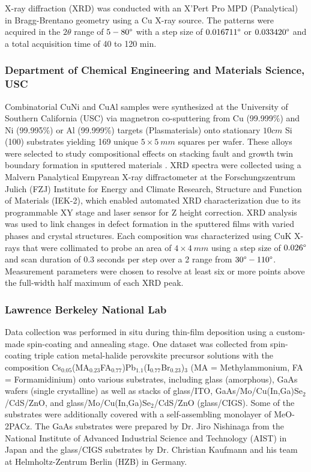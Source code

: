 X-ray diffraction (XRD) was conducted with an X’Pert Pro MPD (Panalytical) in Bragg-Brentano geometry using a Cu X-ray source. The patterns were acquired in the $2\theta$ range of $5-80\degree$ with a step size of $0.016711\degree$ or $0.033420\degree$ and a total acquisition time of 40 to 120 min. \\

\subsubsection*{Department of Chemical Engineering and Materials Science, USC}

Combinatorial CuNi and CuAl samples were synthesized at the University of Southern California (USC) via magnetron co-sputtering from Cu (99.999\%) and Ni (99.995\%) or Al (99.999\%) targets (Plasmaterials) onto stationary $10 \si{cm}$ Si (100) substrates yielding 169 unique $5 \times 5 \ \si{mm}$ squares per wafer. These alloys were selected to study compositional effects on stacking fault and growth twin boundary formation in sputtered materials \cite{2024AcMat.27019839A,alwen2024combinatorial}. XRD spectra were collected using a Malvern Panalytical Empyrean X-ray diffractometer at the Forschungszentrum Julich (FZJ) Institute for Energy and Climate Research, Structure and Function of Materials (IEK-2), which enabled automated XRD characterization due to its programmable XY stage and laser sensor for Z height correction. XRD analysis was used to link changes in defect formation in the sputtered films with varied phases and crystal structures. Each composition was characterized using CuK X-rays that were collimated to probe an area of $4 \times 4 \ \si{mm}$ using a step size of $0.026\degree$ and scan duration of $0.3$ seconds per step over a 2 range from $30\degree - 110\degree$. Measurement parameters were chosen to resolve at least six or more points above the full-width half maximum of each XRD peak.

\subsubsection*{Lawrence Berkeley National Lab}

Data collection was performed in situ during thin-film deposition using a custom-made spin-coating and annealing stage. One dataset was collected from spin-coating triple cation metal-halide perovskite precursor solutions with the composition Cs$_{0.05}$(MA$_{0.23}$FA$_{0.77}$)Pb$_{1.1}$(I$_{0.77}$Br$_{0.23}$)$_{3}$ (MA = Methylammonium, FA = Formamidinium) onto various substrates, including glass (amorphous), GaAs wafers (single crystalline) as well as stacks of glass/ITO, GaAs/Mo/Cu(In,Ga)Se$_{2}$/CdS/ZnO, and glass/Mo/Cu(In,Ga)Se$_{2}$/CdS/ZnO (glass/CIGS). Some of the substrates were additionally covered with a self-assembling monolayer of MeO-2PACz. The GaAs substrates were prepared by Dr. Jiro Nishinaga from the National Institute of Advanced Industrial Science and Technology (AIST) in Japan and the glass/CIGS substrates by Dr. Christian Kaufmann and his team at Helmholtz-Zentrum Berlin (HZB) in Germany. \\


